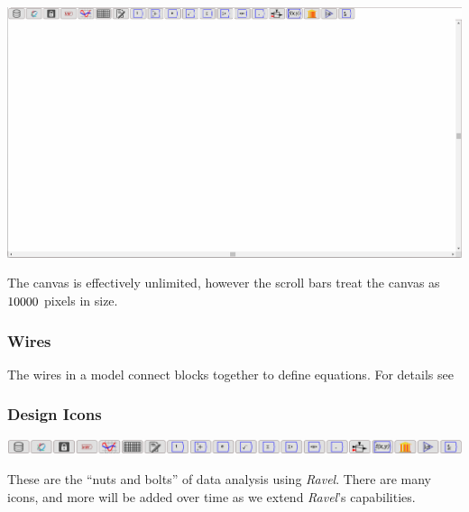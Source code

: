 \noindent\includegraphics[width=\textwidth]{images/DesignCanvas}

The canvas is effectively unlimited, however the scroll bars treat
the canvas as $10000\time10000$ pixels in size.

\subsubsection{Wires}

The wires in a model connect blocks together to define equations.
For details see 

\subsubsection{Design Icons}

\noindent\includegraphics[width=\textwidth]{images/DesignIcons}

These are the ``nuts and bolts'' of data analysis using \emph{Ravel}.
There are many icons, and more will be added over time as we extend
\emph{Ravel}'s capabilities.

